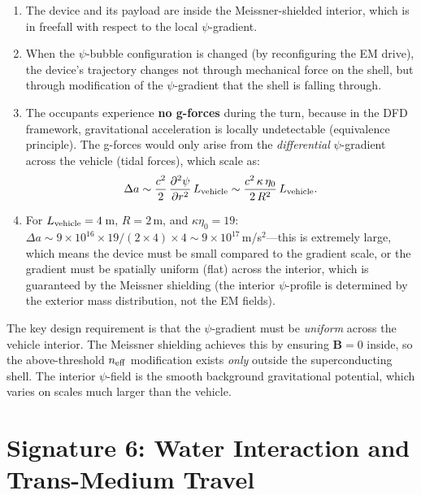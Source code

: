\documentclass[11pt]{article}
\newcommand{\neff}{n_{\rm eff}}
\begin{document}
\begin{enumerate}
\item The device and its payload are inside the Meissner-shielded
  interior, which is in freefall with respect to the local $\psi$-gradient.

\item When the $\psi$-bubble configuration is changed (by reconfiguring the
  EM drive), the device's trajectory changes not through mechanical force
  on the shell, but through modification of the $\psi$-gradient that the
  shell is falling through.

\item The occupants experience \textbf{no g-forces} during the turn,
  because in the DFD framework, gravitational acceleration is locally
  undetectable (equivalence principle). The g-forces would only arise from
  the \emph{differential} $\psi$-gradient across the vehicle (tidal forces),
  which scale as:
  \begin{equation}
  \Delta a \sim \frac{c^2}{2}\,\frac{\partial^2\psi}{\partial r^2}\,L_{\rm vehicle}
    \sim \frac{c^2\,\kappa\,\eta_0}{2\,R^2}\,L_{\rm vehicle}.
  \end{equation}

\item For $L_{\rm vehicle} = 4$\,m, $R = 2$\,m, and $\kappa\eta_0 = 19$:
  $\Delta a \sim 9 \times 10^{16} \times 19/(2 \times 4) \times 4
  \sim 9 \times 10^{17}$\,m/s$^2$---this is extremely large, which means
  the device must be small compared to the gradient scale, or the gradient
  must be spatially uniform (flat) across the interior, which is guaranteed
  by the Meissner shielding (the interior $\psi$-profile is determined by
  the exterior mass distribution, not the EM fields).
\end{enumerate}

The key design requirement is that the $\psi$-gradient must be
\emph{uniform} across the vehicle interior. The Meissner shielding
achieves this by ensuring $\mathbf{B} = 0$ inside, so the
above-threshold $\neff$ modification exists \emph{only} outside the
superconducting shell. The interior $\psi$-field is the smooth
background gravitational potential, which varies on scales much larger
than the vehicle.


\section{Signature 6: Water Interaction and Trans-Medium Travel}
\label{sec:water}
\end{document}
